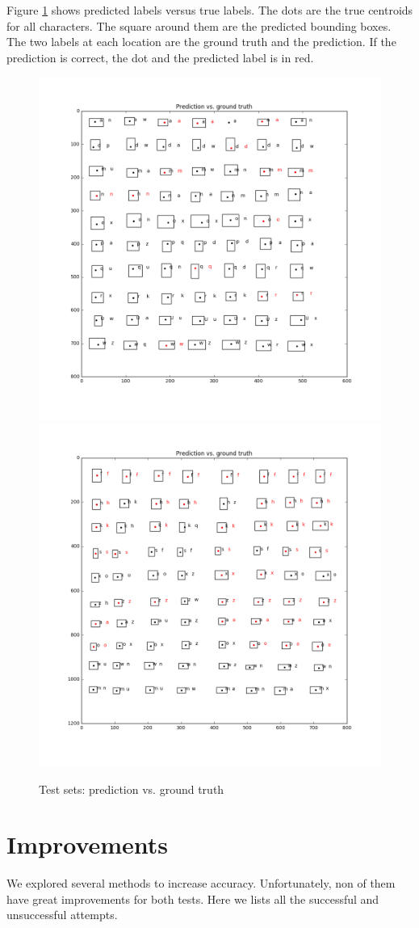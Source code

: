 \documentclass{extarticle}
\theoremstyle{definition}
\theoremstyle{definition}
\begin{document}
Figure \ref{figure4} shows predicted labels versus true labels. The dots are the true centroids for all characters. The square around them are the predicted bounding boxes. The two labels at each location are the ground truth and the prediction. If the prediction is correct, the dot and the predicted label is in red. \\
\begin{figure}[H]
	\includegraphics[width = 0.5\linewidth]{./figures/test1_gt_Prediction_vs_ground_truth_improve0.png}
	\includegraphics[width = 0.5\linewidth]{./figures/test2_gt_Prediction_vs_ground_truth_improve0.png}
	\caption{Test sets: prediction vs. ground truth}
	\label{figure4}
\end{figure}



\pagebreak
\section{Improvements}
We explored several methods to increase accuracy. Unfortunately, non of them have great improvements for both tests. Here we lists all the successful and unsuccessful attempts. \\
\end{document}
